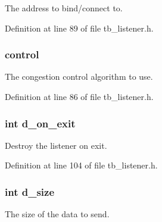 The address to bind/connect to. 



Definition at line 89 of file tb\-\_\-listener.\-h.

\hypertarget{structtb__test__params__t_a50b4d1da7c10bfd1e9365a1c37d09442}{
\subsubsection[{control}]{ control}}\label{structtb__test__params__t_a50b4d1da7c10bfd1e9365a1c37d09442}


The congestion control algorithm to use. 



Definition at line 86 of file tb\-\_\-listener.\-h.

\hypertarget{structtb__test__params__t_a093a636a4cc3aec4f564b9ab29081b59}{
\subsubsection[{d\-\_\-on\-\_\-exit}]{\setlength{\rightskip}{0pt plus 5cm}int d\-\_\-on\-\_\-exit}}\label{structtb__test__params__t_a093a636a4cc3aec4f564b9ab29081b59}


Destroy the listener on exit. 



Definition at line 104 of file tb\-\_\-listener.\-h.

\hypertarget{structtb__test__params__t_a848d9c2765e62bac90bee8355062858a}{
\subsubsection[{d\-\_\-size}]{\setlength{\rightskip}{0pt plus 5cm}int d\-\_\-size}}\label{structtb__test__params__t_a848d9c2765e62bac90bee8355062858a}


The size of the data to send. 



